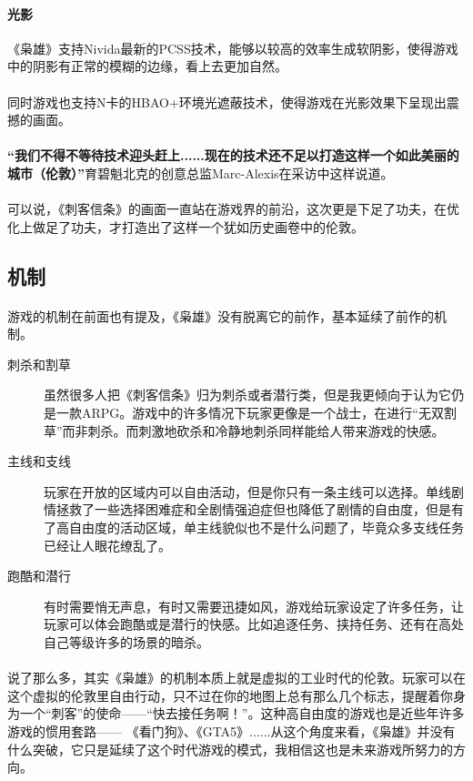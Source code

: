 \documentclass{article} \usepackage{CJK}
\begin{document}
\paragraph{光影}
《枭雄》支持Nivida最新的PCSS技术，能够以较高的效率生成软阴影，使得游戏中的阴影有正常的模糊的边缘，看上去更加自然。
\paragraph{}
同时游戏也支持N卡的HBAO+环境光遮蔽技术，使得游戏在光影效果下呈现出震撼的画面。
\paragraph{}
\textbf{“我们不得不等待技术迎头赶上......现在的技术还不足以打造这样一个如此美丽的城市（伦敦）”}育碧魁北克的创意总监Marc-Alexis在采访中这样说道。
\paragraph{}
可以说，《刺客信条》的画面一直站在游戏界的前沿，这次更是下足了功夫，在优化上做足了功夫，才打造出了这样一个犹如历史画卷中的伦敦。
\subsection{机制}
\paragraph{}
游戏的机制在前面也有提及，《枭雄》没有脱离它的前作，基本延续了前作的机制。
\begin{description}
  \item[刺杀和割草] 虽然很多人把《刺客信条》归为刺杀或者潜行类，但是我更倾向于认为它仍是一款ARPG。游戏中的许多情况下玩家更像是一个战士，在进行“无双割草”而非刺杀。而刺激地砍杀和冷静地刺杀同样能给人带来游戏的快感。
  \item[主线和支线] 玩家在开放的区域内可以自由活动，但是你只有一条主线可以选择。单线剧情拯救了一些选择困难症和全剧情强迫症但也降低了剧情的自由度，但是有了高自由度的活动区域，单主线貌似也不是什么问题了，毕竟众多支线任务已经让人眼花缭乱了。
  \item[跑酷和潜行] 有时需要悄无声息，有时又需要迅捷如风，游戏给玩家设定了许多任务，让玩家可以体会跑酷或是潜行的快感。比如追逐任务、挟持任务、还有在高处自己等级许多的场景的暗杀。
\end{description}
\paragraph{}
说了那么多，其实《枭雄》的机制本质上就是虚拟的工业时代的伦敦。玩家可以在这个虚拟的伦敦里自由行动，只不过在你的地图上总有那么几个标志，提醒着你身为一个“刺客”的使命——“快去接任务啊！”。这种高自由度的游戏也是近些年许多游戏的惯用套路——
《看门狗》、《GTA5》......从这个角度来看，《枭雄》并没有什么突破，它只是延续了这个时代游戏的模式，我相信这也是未来游戏所努力的方向。
\end{document}
